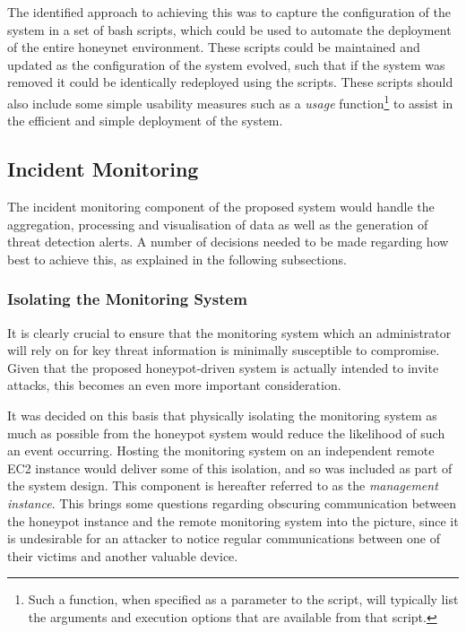         The identified approach to achieving this was to capture the configuration of the system in a set of bash scripts, which could be used to automate the deployment of the entire honeynet environment. These scripts could be maintained and updated as the configuration of the system evolved, such that if the system was removed it could be identically redeployed using the scripts. These scripts should also include some simple usability measures such as a \textit{usage} function\footnote{Such a function, when specified as a parameter to the script, will typically list the arguments and execution options that are available from that script.} to assist in the efficient and simple deployment of the system.
        
\subsection{Incident Monitoring} \label{IncidentMonitoringDesign}
The incident monitoring component of the proposed system would handle the aggregation, processing and visualisation of data as well as the generation of threat detection alerts. A number of decisions needed to be made regarding how best to achieve this, as explained in the following subsections.

\subsubsection{Isolating the Monitoring System} \label{IsolatingMonitoringSystem}
It is clearly crucial to ensure that the monitoring system which an administrator will rely on for key threat information is minimally susceptible to compromise. Given that the proposed honeypot-driven system is actually intended to invite attacks, this becomes an even more important consideration.

It was decided on this basis that physically isolating the monitoring system as much as possible from the honeypot system would reduce the likelihood of such an event occurring. Hosting the monitoring system on an independent remote EC2 instance would deliver some of this isolation, and so was included as part of the system design. This component is hereafter referred to as the \textit{management instance}. This brings some questions regarding obscuring communication between the honeypot instance and the remote monitoring system into the picture, since it is undesirable for an attacker to notice regular communications between one of their victims and another valuable device. 

